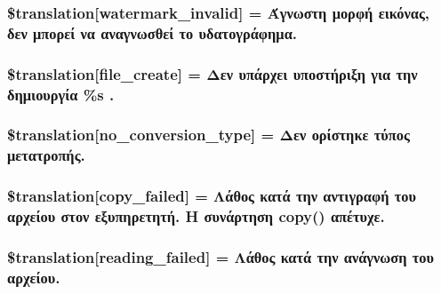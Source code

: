 \subsubsection[{\$translation}]{\setlength{\rightskip}{0pt plus 5cm}\$translation\mbox{[}\textquotesingle{}watermark\+\_\+invalid\textquotesingle{}\mbox{]} = \textquotesingle{}Άγνωστη μορφή εικόνας, δεν μπορεί να αναγνωσθεί το υδατογράφημα.\textquotesingle{}}\label{class_8upload_8el___g_r_8php_ac336e7a5701e47ba4a05e9e498a3cc44}
\hypertarget{class_8upload_8el___g_r_8php_a1ecb4673e4fb69e06b3f20b65cecf30a}{}
\subsubsection[{\$translation}]{\setlength{\rightskip}{0pt plus 5cm}\$translation\mbox{[}\textquotesingle{}file\+\_\+create\textquotesingle{}\mbox{]} = \textquotesingle{}Δεν υπάρχει υποστήριξη για την δημιουργία \%s .\textquotesingle{}}\label{class_8upload_8el___g_r_8php_a1ecb4673e4fb69e06b3f20b65cecf30a}
\hypertarget{class_8upload_8el___g_r_8php_a4712d7ec28e9a7f17eb3338af2358363}{}
\subsubsection[{\$translation}]{\setlength{\rightskip}{0pt plus 5cm}\$translation\mbox{[}\textquotesingle{}no\+\_\+conversion\+\_\+type\textquotesingle{}\mbox{]} = \textquotesingle{}Δεν ορίστηκε τύπος μετατροπής.\textquotesingle{}}\label{class_8upload_8el___g_r_8php_a4712d7ec28e9a7f17eb3338af2358363}
\hypertarget{class_8upload_8el___g_r_8php_a783c9358bcf54a054545b50098bc679b}{}
\subsubsection[{\$translation}]{\setlength{\rightskip}{0pt plus 5cm}\$translation\mbox{[}\textquotesingle{}copy\+\_\+failed\textquotesingle{}\mbox{]} = \textquotesingle{}Λάθος κατά την αντιγραφή του αρχείου στον εξυπηρετητή. Η συνάρτηση copy() απέτυχε.\textquotesingle{}}\label{class_8upload_8el___g_r_8php_a783c9358bcf54a054545b50098bc679b}
\hypertarget{class_8upload_8el___g_r_8php_a01bea14c9fd5f353f62db44beabfcd42}{}
\subsubsection[{\$translation}]{\setlength{\rightskip}{0pt plus 5cm}\$translation\mbox{[}\textquotesingle{}reading\+\_\+failed\textquotesingle{}\mbox{]} = \textquotesingle{}Λάθος κατά την ανάγνωση του αρχείου.\textquotesingle{}}\label{class_8upload_8el___g_r_8php_a01bea14c9fd5f353f62db44beabfcd42}
